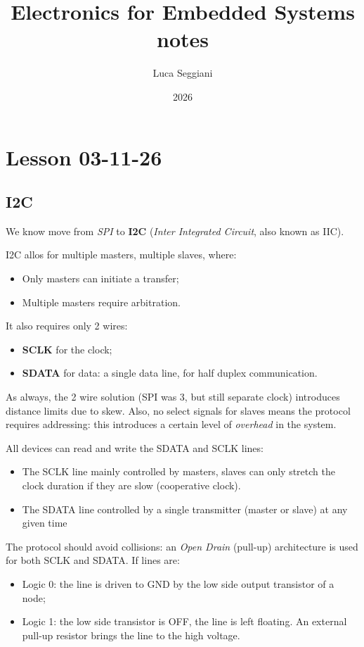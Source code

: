 \documentclass[a4paper,11pt]{article}
\title{Electronics for Embedded Systems notes}
\author{Luca Seggiani}
\date{2026}
\begin{document}
\section{Lesson 03-11-26}

\thispagestyle{empty}
\pagestyle{fancy}

\subsection{I2C}

We know move from \textit{SPI} to \textbf{I2C} (\textit{Inter Integrated Circuit}, also known as IIC).

I2C allos for multiple masters, multiple slaves, where:
\begin{itemize}
	\item Only masters can initiate a transfer;
	\item Multiple masters require arbitration.
\end{itemize}

It also requires only 2 wires:
\begin{itemize}
	\item \textbf{SCLK} for the clock;
	\item \textbf{SDATA} for data: a single data line, for half duplex communication.
\end{itemize}

As always, the 2 wire solution (SPI was 3, but still separate clock) introduces distance limits due to skew.
Also, no select signals for slaves means the protocol requires addressing: this introduces a certain level of \textit{overhead} in the system.

All devices can read and write the SDATA and SCLK lines:
\begin{itemize}
	\item The SCLK line mainly controlled by masters, slaves can only stretch the clock duration if they are slow (cooperative clock).
	\item The SDATA line controlled by a single transmitter (master or slave) at any given time
\end{itemize}

The protocol should avoid collisions: an \textit{Open Drain} (pull-up) architecture is used for both SCLK and SDATA.
If lines are:
\begin{itemize}
\item Logic 0: the line is driven to GND by the low side output transistor of a node;
\item Logic 1: the low side transistor is OFF, the line is left floating. An external pull-up resistor brings the line to the high voltage.
\end{itemize}
\end{document}
